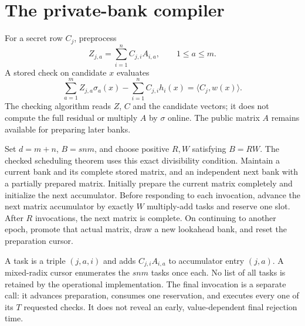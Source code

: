 \documentclass[11pt,letterpaper]{article}
\theoremstyle{definition}
\newcommand{\dotp}[2]{\langle #1,#2\rangle}
\begin{document}
\section{The private-bank compiler}
\label{sec:compiler}
For a secret row $C_j$, preprocess
\[
 Z_{j,a}=\sum_{i=1}^{n} C_{j,i}A_{i,a},\qquad 1\le a\le m.
\]
A stored check on candidate $x$ evaluates
\begin{equation}
 \sum_{a=1}^{m}Z_{j,a}\sigma_a(x)
 -\sum_{i=1}^{n}C_{j,i}h_i(x)
 =\dotp{C_j}{w(x)}.
 \label{eq:stored}
\end{equation}
The checking algorithm reads $Z$, $C$ and the candidate vectors; it does not compute the full residual or multiply $A$ by $\sigma$ online. The public matrix $A$ remains available for preparing later banks.

Set $d=m+n$, $B=snm$, and choose positive $R,W$ satisfying $B=RW$. The checked scheduling theorem uses this exact divisibility condition. Maintain a current bank and its complete stored matrix, and an independent next bank with a partially prepared matrix. Initially prepare the current matrix completely and initialize the next accumulator. Before responding to each invocation, advance the next matrix accumulator by exactly $W$ multiply-add tasks and reserve one slot. After $R$ invocations, the next matrix is complete. On continuing to another epoch, promote that actual matrix, draw a new lookahead bank, and reset the preparation cursor.

A task is a triple $(j,a,i)$ and adds $C_{j,i}A_{i,a}$ to accumulator entry $(j,a)$. A mixed-radix cursor enumerates the $snm$ tasks once each. No list of all tasks is retained by the operational implementation. The final invocation is a separate call: it advances preparation, consumes one reservation, and executes every one of its $T$ requested checks. It does not reveal an early, value-dependent final rejection time.
\end{document}
